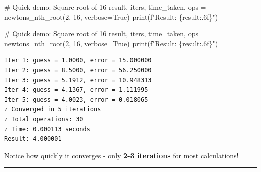 \documentclass[
  letterpaper,
  DIV=11,
  numbers=noendperiod]{scrartcl}
\newenvironment{Shaded}{\begin{snugshade}}{\end{snugshade}}
\newcommand{\BuiltInTok}[1]{\textcolor[rgb]{0.00,0.23,0.31}{#1}}
\newcommand{\CommentTok}[1]{\textcolor[rgb]{0.37,0.37,0.37}{#1}}
\newcommand{\DecValTok}[1]{\textcolor[rgb]{0.68,0.00,0.00}{#1}}
\newcommand{\NormalTok}[1]{\textcolor[rgb]{0.00,0.23,0.31}{#1}}
\newcommand{\OperatorTok}[1]{\textcolor[rgb]{0.37,0.37,0.37}{#1}}
\newcommand{\SpecialCharTok}[1]{\textcolor[rgb]{0.37,0.37,0.37}{#1}}
\newcommand{\SpecialStringTok}[1]{\textcolor[rgb]{0.13,0.47,0.30}{#1}}
\newcommand{\VariableTok}[1]{\textcolor[rgb]{0.07,0.07,0.07}{#1}}
\begin{document}
\begin{Shaded}
\begin{Highlighting}[]
\CommentTok{\# Quick demo: Square root of 16}
\NormalTok{result, iters, time\_taken, ops }\OperatorTok{=}\NormalTok{ newtons\_nth\_root(}\DecValTok{2}\NormalTok{, }\DecValTok{16}\NormalTok{, verbose}\OperatorTok{=}\VariableTok{True}\NormalTok{)}
\BuiltInTok{print}\NormalTok{(}\SpecialStringTok{f"Result: }\SpecialCharTok{\{}\NormalTok{result}\SpecialCharTok{:.6f\}}\SpecialStringTok{"}\NormalTok{)}
\end{Highlighting}
\end{Shaded}

\begin{Shaded}
\begin{Highlighting}[]
\CommentTok{\# Quick demo: Square root of 16}
\NormalTok{result, iters, time\_taken, ops }\OperatorTok{=}\NormalTok{ newtons\_nth\_root(}\DecValTok{2}\NormalTok{, }\DecValTok{16}\NormalTok{, verbose}\OperatorTok{=}\VariableTok{True}\NormalTok{)}
\BuiltInTok{print}\NormalTok{(}\SpecialStringTok{f"Result: }\SpecialCharTok{\{}\NormalTok{result}\SpecialCharTok{:.6f\}}\SpecialStringTok{"}\NormalTok{)}
\end{Highlighting}
\end{Shaded}

\begin{verbatim}
Iter 1: guess = 1.0000, error = 15.000000
Iter 2: guess = 8.5000, error = 56.250000
Iter 3: guess = 5.1912, error = 10.948313
Iter 4: guess = 4.1367, error = 1.111995
Iter 5: guess = 4.0023, error = 0.018065
✓ Converged in 5 iterations
✓ Total operations: 30
✓ Time: 0.000113 seconds
Result: 4.000001
\end{verbatim}

\begin{tcolorbox}[enhanced jigsaw, bottomrule=.15mm, rightrule=.15mm, leftrule=.75mm, colbacktitle=quarto-callout-tip-color!10!white, coltitle=black, arc=.35mm, left=2mm, toptitle=1mm, colback=white, colframe=quarto-callout-tip-color-frame, breakable, toprule=.15mm, bottomtitle=1mm, title=\textcolor{quarto-callout-tip-color}{\faLightbulb}\hspace{0.5em}{Key Observation}, titlerule=0mm, opacitybacktitle=0.6, opacityback=0]

Notice how quickly it converges - only {\textbf{2-3 iterations}} for
most calculations!

\end{tcolorbox}

\begin{center}\rule{0.5\linewidth}{0.5pt}\end{center}
\end{document}
